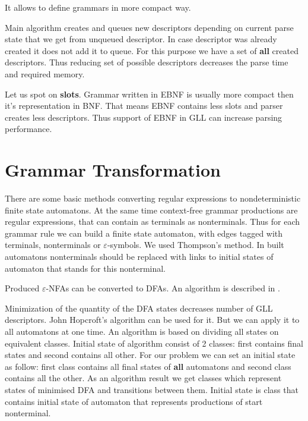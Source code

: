 \documentclass[runningheads,a4paper]{llncs}
\begin{document}
It allows to define grammars in more compact way.

Main algorithm creates and queues new descriptors depending on current parse state that we get from unqueued descriptor. 
In case descriptor was already created it does not add it to queue. For this purpose we have a set of
\textbf{all} created descriptors. Thus reducing set of possible descriptors decreases the parse time
and required memory.

Let us spot on \textbf{slots}. Grammar written in EBNF is usually more compact then it's representation in BNF. That means EBNF contains 
less slots and parser creates less descriptors. Thus support of EBNF in GLL can increase parsing performance. 

\section{Grammar Transformation}%

There are some basic methods converting regular expressions to nondeterministic finite state automatons. 
At the same time context-free grammar productions are regular expressions, that can contain as terminals 
as nonterminals. Thus for each grammar rule we can build a finite state automaton, with edges tagged with 
terminals, nonterminals or $\varepsilon$-symbols. We used Thompson's method\cite{Thompson:1968:PTR:363347.363387}. 
In built automatons nonterminals should be replaced with links to initial states of automaton that stands 
for this nonterminal.

Produced $\varepsilon$-NFAs can be converted to DFAs. An algorithm is described in \cite{aho1974design}.

Minimization of the quantity of the DFA states decreases number of GLL descriptors. John Hopcroft's 
algorithm\cite{hopcroft1971n} can be used for it. But we can apply it to all automatons at one time. 
An algorithm is based on dividing all states on equivalent classes. Initial state of algorithm consist 
of 2 classes: first contains final states and second contains all other. For our problem we can set an 
initial state as follow: first class contains all final states of \textbf{all} automatons and second class 
contains all the other. As an algorithm result we get classes which represent states of minimised DFA and 
transitions between them.
Initial state is class that contains initial state of automaton that represents productions of start nonterminal.
\end{document}
